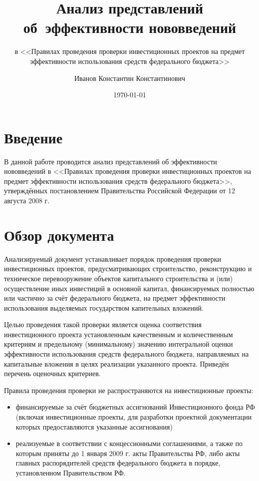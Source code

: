 \documentclass[a4paper, 12pt, numbers=enddot]{scrartcl}
\begin{document}
\title{\Large Анализ представлений\\ об~эффективности нововведений}
\subtitle{\normalsize в <<Правилах проведения проверки инвестиционных проектов
на предмет эффективности использования средств федерального бюджета>>}

\author{\large Иванов Константин Константинович}
\date{\large \today}
\maketitle

\section{Введение}
В данной работе проводится анализ представлений об эффективности нововведений в
<<Правилах проведения проверки инвестиционных проектов на предмет эффективности
использования средств федерального бюджета>>, утверждённых постановлением
Правительства Российской Федерации от 12 августа 2008 г.

\section{Обзор документа}
Анализируемый документ устанавливает порядок проведения проверки инвестиционных
проектов, предусматривающих строительство, реконструкцию и техническое
перевооружение объектов капитального строительства и (или) осуществление иных
инвестиций в основной капитал, финансируемых полностью или частично за счёт
федерального бюджета, на предмет эффективности использования выделяемых
государством капительных вложений.

Целью проведения такой проверки является оценка соответствия инвестиционного
проекта установленным качественным и количественным критериям и предельному
(минимальному) значению интегральной оценки эффективности использования средств
федерального бюджета, направляемых на капитальные вложения в целях реализации
указанного проекта. Приведён перечень оценочных критериев.

Правила проведения проверки не распространяются на инвестиционные проекты: 
\begin{itemize}
  \setlength{\itemsep}{0 pt}
  \setlength{\parsep}{0 pt} 
  \item финансируемые за счёт бюджетных ассигнований Инвестиционного фонда РФ
    (включая инвестиционные проекты, для разработки проектной
     документации которых предоставляются указанные ассигнования)
  \item реализуемые в соответствии с концессионными соглашениями, а также по
    которым приняты до 1 января 2009 г. акты Правительства РФ, либо акты
    главных распорядителей средств федерального бюджета в порядке,
    установленном Правительством РФ.
\end{itemize}
\end{document}
